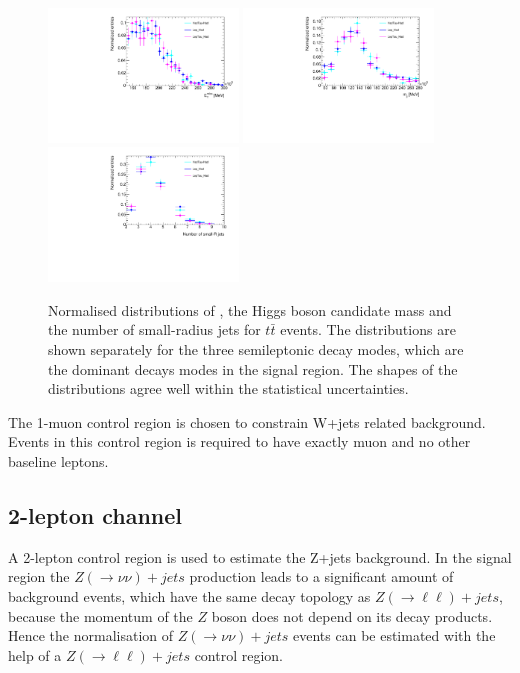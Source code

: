 \begin{figure}[h]
    \centering
	\includegraphics[width=0.45\textwidth]{chapters/c7/figures/ttbar_MetTST_met.pdf}
	\includegraphics[width=0.45\textwidth]{chapters/c7/figures/ttbar_m_jj.pdf}
	\includegraphics[width=0.45\textwidth]{chapters/c7/figures/ttbar_N_Jets04.pdf}		
	\caption{Normalised distributions of \met, the Higgs boson candidate mass and the number of small-radius jets for $t\bar{t}$ events. The distributions are shown separately for the three semileptonic decay modes, which are the dominant decays modes in the signal region. The shapes of the distributions agree well within the statistical uncertainties.}
	\label{fig:ttbarDecayCatKinematic}
\end{figure}

\par The 1-muon control region is chosen to constrain W+jets related background. Events in this control region is required to have exactly muon and no other baseline leptons.

\subsection{2-lepton channel}
\par A 2-lepton control region is used to estimate the Z+jets background. In the signal region the $Z(\to\nu\nu)+jets$ production leads to a significant amount of background events, which have the same decay topology as $Z(\to\ell\ell)+jets$, because the momentum of the $Z$ boson does not depend on its decay products. Hence the normalisation of $Z(\to\nu\nu)+jets$ events can be estimated with the help of a $Z(\to\ell\ell)+jets$ control region.

